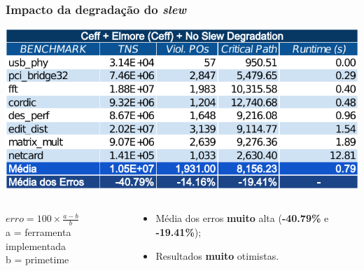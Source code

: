 \documentclass[10pt,a4paper]{beamer}
\begin{document}
		\begin{frame}[t]
			\frametitle{Impacto da degradação do \textit{slew}}
			\vspace{-.5cm}
			\begin{center}
				\includegraphics[width=\linewidth]{img/ceff_elmore_no_slew.pdf}
			\end{center}
			\vspace{-.5cm}
			\begin{columns}
				\begin{column}{0.4\textwidth}
					\begin{shaded}
						$erro = 100 \times \frac{a - b}{ b } $ \\
						\small{a = ferramenta implementada} \\
						\small{b = primetime}
					\end{shaded}
				\end{column}
				\begin{column}{0.6\textwidth}
					\begin{itemize}
						\item Média dos erros \textbf{muito} alta (\textbf{-40.79\%} e \textbf{-19.41\%});
						\item Resultados \textbf{muito} otimistas.
					\end{itemize}
				\end{column}
			\end{columns}	
			
		\end{frame}
		
\end{document}
